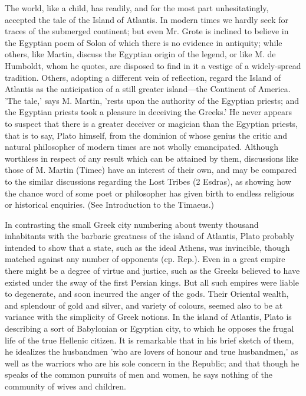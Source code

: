 \documentclass[11pt,letter]{article}
\begin{document}
\par  The world, like a child, has readily, and for the most part unhesitatingly, accepted the tale of the Island of Atlantis. In modern times we hardly seek for traces of the submerged continent; but even Mr. Grote is inclined to believe in the Egyptian poem of Solon of which there is no evidence in antiquity; while others, like Martin, discuss the Egyptian origin of the legend, or like M. de Humboldt, whom he quotes, are disposed to find in it a vestige of a widely-spread tradition. Others, adopting a different vein of reflection, regard the Island of Atlantis as the anticipation of a still greater island—the Continent of America. 'The tale,' says M. Martin, 'rests upon the authority of the Egyptian priests; and the Egyptian priests took a pleasure in deceiving the Greeks.' He never appears to suspect that there is a greater deceiver or magician than the Egyptian priests, that is to say, Plato himself, from the dominion of whose genius the critic and natural philosopher of modern times are not wholly emancipated. Although worthless in respect of any result which can be attained by them, discussions like those of M. Martin (Timee) have an interest of their own, and may be compared to the similar discussions regarding the Lost Tribes (2 Esdras), as showing how the chance word of some poet or philosopher has given birth to endless religious or historical enquiries. (See Introduction to the Timaeus.)

\par  In contrasting the small Greek city numbering about twenty thousand inhabitants with the barbaric greatness of the island of Atlantis, Plato probably intended to show that a state, such as the ideal Athens, was invincible, though matched against any number of opponents (cp. Rep.). Even in a great empire there might be a degree of virtue and justice, such as the Greeks believed to have existed under the sway of the first Persian kings. But all such empires were liable to degenerate, and soon incurred the anger of the gods. Their Oriental wealth, and splendour of gold and silver, and variety of colours, seemed also to be at variance with the simplicity of Greek notions. In the island of Atlantis, Plato is describing a sort of Babylonian or Egyptian city, to which he opposes the frugal life of the true Hellenic citizen. It is remarkable that in his brief sketch of them, he idealizes the husbandmen 'who are lovers of honour and true husbandmen,' as well as the warriors who are his sole concern in the Republic; and that though he speaks of the common pursuits of men and women, he says nothing of the community of wives and children.
\end{document}

